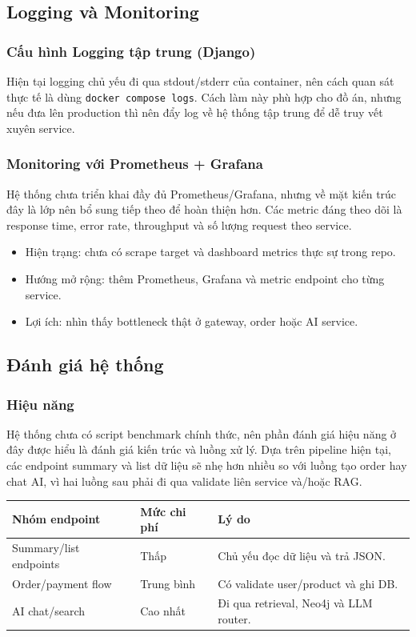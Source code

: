 \documentclass[12pt,a4paper]{article}
\begin{document}
\subsection{Logging và Monitoring}
\subsubsection{Cấu hình Logging tập trung (Django)}
Hiện tại logging chủ yếu đi qua stdout/stderr của container, nên cách quan sát thực tế là dùng \texttt{docker compose logs}. Cách làm này phù hợp cho đồ án, nhưng nếu đưa lên production thì nên đẩy log về hệ thống tập trung để dễ truy vết xuyên service.

\subsubsection{Monitoring với Prometheus + Grafana}
Hệ thống chưa triển khai đầy đủ Prometheus/Grafana, nhưng về mặt kiến trúc đây là lớp nên bổ sung tiếp theo để hoàn thiện hơn. Các metric đáng theo dõi là response time, error rate, throughput và số lượng request theo service.

\begin{itemize}
  \item Hiện trạng: chưa có scrape target và dashboard metrics thực sự trong repo.
  \item Hướng mở rộng: thêm Prometheus, Grafana và metric endpoint cho từng service.
  \item Lợi ích: nhìn thấy bottleneck thật ở gateway, order hoặc AI service.
\end{itemize}

\subsection{Đánh giá hệ thống}
\subsubsection{Hiệu năng}
Hệ thống chưa có script benchmark chính thức, nên phần đánh giá hiệu năng ở đây được hiểu là đánh giá kiến trúc và luồng xử lý. Dựa trên pipeline hiện tại, các endpoint summary và list dữ liệu sẽ nhẹ hơn nhiều so với luồng tạo order hay chat AI, vì hai luồng sau phải đi qua validate liên service và/hoặc RAG.

\begin{longtable}{p{4.2cm}p{3.2cm}p{5.6cm}}
\toprule
\textbf{Nhóm endpoint} & \textbf{Mức chi phí} & \textbf{Lý do} \\
\midrule
Summary/list endpoints & Thấp & Chủ yếu đọc dữ liệu và trả JSON. \\
Order/payment flow & Trung bình & Có validate user/product và ghi DB. \\
AI chat/search & Cao nhất & Đi qua retrieval, Neo4j và LLM router. \\
\bottomrule
\end{longtable}
\end{document}
